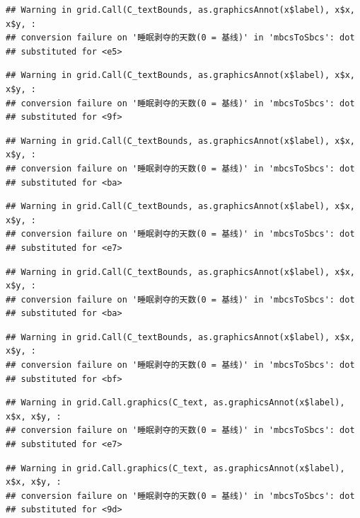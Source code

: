 \documentclass[
]{book}
\begin{document}
\begin{verbatim}
## Warning in grid.Call(C_textBounds, as.graphicsAnnot(x$label), x$x, x$y, :
## conversion failure on '睡眠剥夺的天数(0 = 基线)' in 'mbcsToSbcs': dot
## substituted for <e5>
\end{verbatim}

\begin{verbatim}
## Warning in grid.Call(C_textBounds, as.graphicsAnnot(x$label), x$x, x$y, :
## conversion failure on '睡眠剥夺的天数(0 = 基线)' in 'mbcsToSbcs': dot
## substituted for <9f>
\end{verbatim}

\begin{verbatim}
## Warning in grid.Call(C_textBounds, as.graphicsAnnot(x$label), x$x, x$y, :
## conversion failure on '睡眠剥夺的天数(0 = 基线)' in 'mbcsToSbcs': dot
## substituted for <ba>
\end{verbatim}

\begin{verbatim}
## Warning in grid.Call(C_textBounds, as.graphicsAnnot(x$label), x$x, x$y, :
## conversion failure on '睡眠剥夺的天数(0 = 基线)' in 'mbcsToSbcs': dot
## substituted for <e7>
\end{verbatim}

\begin{verbatim}
## Warning in grid.Call(C_textBounds, as.graphicsAnnot(x$label), x$x, x$y, :
## conversion failure on '睡眠剥夺的天数(0 = 基线)' in 'mbcsToSbcs': dot
## substituted for <ba>
\end{verbatim}

\begin{verbatim}
## Warning in grid.Call(C_textBounds, as.graphicsAnnot(x$label), x$x, x$y, :
## conversion failure on '睡眠剥夺的天数(0 = 基线)' in 'mbcsToSbcs': dot
## substituted for <bf>
\end{verbatim}

\begin{verbatim}
## Warning in grid.Call.graphics(C_text, as.graphicsAnnot(x$label), x$x, x$y, :
## conversion failure on '睡眠剥夺的天数(0 = 基线)' in 'mbcsToSbcs': dot
## substituted for <e7>
\end{verbatim}

\begin{verbatim}
## Warning in grid.Call.graphics(C_text, as.graphicsAnnot(x$label), x$x, x$y, :
## conversion failure on '睡眠剥夺的天数(0 = 基线)' in 'mbcsToSbcs': dot
## substituted for <9d>
\end{verbatim}
\end{document}
